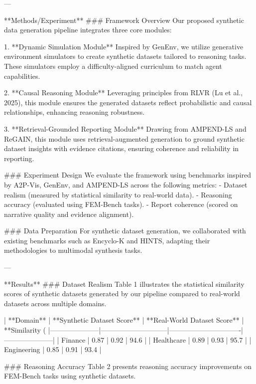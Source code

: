 ---

**Methods/Experiment**  
### Framework Overview  
Our proposed synthetic data generation pipeline integrates three core modules:  

1. **Dynamic Simulation Module**  
   Inspired by GenEnv, we utilize generative environment simulators to create synthetic datasets tailored to reasoning tasks. These simulators employ a difficulty-aligned curriculum to match agent capabilities.  

2. **Causal Reasoning Module**  
   Leveraging principles from RLVR (Lu et al., 2025), this module ensures the generated datasets reflect probabilistic and causal relationships, enhancing reasoning robustness.  

3. **Retrieval-Grounded Reporting Module**  
   Drawing from AMPEND-LS and ReGAIN, this module uses retrieval-augmented generation to ground synthetic dataset insights with evidence citations, ensuring coherence and reliability in reporting.  

### Experiment Design  
We evaluate the framework using benchmarks inspired by A2P-Vis, GenEnv, and AMPEND-LS across the following metrics:  
- Dataset realism (measured by statistical similarity to real-world data).  
- Reasoning accuracy (evaluated using FEM-Bench tasks).  
- Report coherence (scored on narrative quality and evidence alignment).  

### Data Preparation  
For synthetic dataset generation, we collaborated with existing benchmarks such as Encyclo-K and HINTS, adapting their methodologies to multimodal synthesis tasks.  

---

**Results**  
### Dataset Realism  
Table 1 illustrates the statistical similarity scores of synthetic datasets generated by our pipeline compared to real-world datasets across multiple domains.  

| **Domain**         | **Synthetic Dataset Score** | **Real-World Dataset Score** | **Similarity (%
|---------------------|-----------------------------|-------------------------------|---------------------|
| Finance             | 0.87                        | 0.92                          | 94.6               |
| Healthcare          | 0.89                        | 0.93                          | 95.7               |
| Engineering         | 0.85                        | 0.91                          | 93.4               |

### Reasoning Accuracy  
Table 2 presents reasoning accuracy improvements on FEM-Bench tasks using synthetic datasets.  

